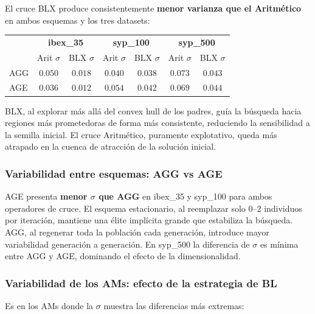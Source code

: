 \documentclass[12pt,a4paper]{article}
\begin{document}
El cruce BLX produce consistentemente \textbf{menor varianza que el Aritmético}
en ambos esquemas y los tres datasets:

\begin{center}\footnotesize
\begin{tabular}{lcc|cc|cc}
\toprule
 & \multicolumn{2}{c|}{\textbf{ibex\_35}} & \multicolumn{2}{c|}{\textbf{syp\_100}} & \multicolumn{2}{c}{\textbf{syp\_500}} \\
 & Arit $\sigma$ & BLX $\sigma$ & Arit $\sigma$ & BLX $\sigma$ & Arit $\sigma$ & BLX $\sigma$ \\
\midrule
AGG & $0.050$ & $0.018$ & $0.040$ & $0.038$ & $0.073$ & $0.043$ \\
AGE & $0.036$ & $0.012$ & $0.054$ & $0.042$ & $0.069$ & $0.044$ \\
\bottomrule
\end{tabular}
\end{center}

BLX, al explorar más allá del convex hull de los padres, guía la búsqueda hacia
regiones más prometedoras de forma más consistente, reduciendo la sensibilidad a la
semilla inicial. El cruce Aritmético, puramente explotativo, queda más atrapado
en la cuenca de atracción de la solución inicial.

\subsubsection*{Variabilidad entre esquemas: AGG vs AGE}

AGE presenta \textbf{menor $\sigma$ que AGG} en ibex\_35 y syp\_100 para ambos
operadores de cruce. El esquema estacionario, al reemplazar solo 0--2 individuos por
iteración, mantiene una élite implícita grande que estabiliza la búsqueda. AGG, al
regenerar toda la población cada generación, introduce mayor variabilidad generación
a generación. En syp\_500 la diferencia de $\sigma$ es mínima entre AGG y AGE,
dominando el efecto de la dimensionalidad.

\subsubsection*{Variabilidad de los AMs: efecto de la estrategia de BL}

Es en los AMs donde la $\sigma$ muestra las diferencias más extremas:
\end{document}
